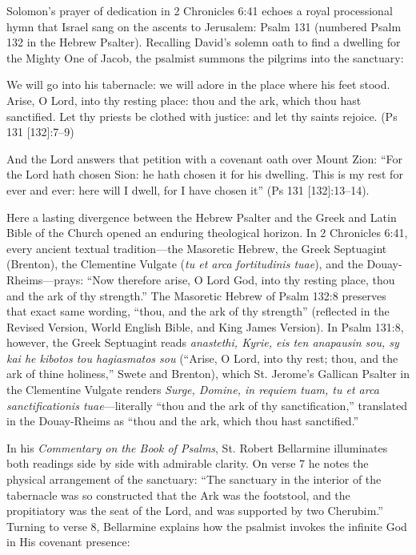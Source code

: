 Solomon's prayer of dedication in 2 Chronicles 6:41 echoes a royal processional hymn that Israel sang on the ascents to Jerusalem: Psalm 131 (numbered Psalm 132 in the Hebrew Psalter). Recalling David's solemn oath to find a dwelling for the Mighty One of Jacob, the psalmist summons the pilgrims into the sanctuary:

\begin{scriptureblock}
We will go into his tabernacle: we will adore in the place where his feet stood. Arise, O Lord, into thy resting place: thou and the ark, which thou hast sanctified. Let thy priests be clothed with justice: and let thy saints rejoice. \textnormal{(Ps 131 [132]:7--9)}
\end{scriptureblock}

And the Lord answers that petition with a covenant oath over Mount Zion: ``For the Lord hath chosen Sion: he hath chosen it for his dwelling. This is my rest for ever and ever: here will I dwell, for I have chosen it'' (Ps 131 [132]:13--14).

Here a lasting divergence between the Hebrew Psalter and the Greek and Latin Bible of the Church opened an enduring theological horizon. In 2 Chronicles 6:41, every ancient textual tradition---the Masoretic Hebrew, the Greek Septuagint (Brenton), the Clementine Vulgate (\textit{tu et arca fortitudinis tuae}), and the Douay-Rheims---prays: ``Now therefore arise, O Lord God, into thy resting place, thou and the ark of thy strength.'' The Masoretic Hebrew of Psalm 132:8 preserves that exact same wording, ``thou, and the ark of thy strength'' (reflected in the Revised Version, World English Bible, and King James Version). In Psalm 131:8, however, the Greek Septuagint reads \textit{anastethi, Kyrie, eis ten anapausin sou, sy kai he kibotos tou hagiasmatos sou} (``Arise, O Lord, into thy rest; thou, and the ark of thine holiness,'' Swete and Brenton), which St. Jerome's Gallican Psalter in the Clementine Vulgate renders \textit{Surge, Domine, in requiem tuam, tu et arca sanctificationis tuae}---literally ``thou and the ark of thy sanctification,'' translated in the Douay-Rheims as ``thou and the ark, which thou hast sanctified.''

In his \textit{Commentary on the Book of Psalms}, St. Robert Bellarmine illuminates both readings side by side with admirable clarity. On verse 7 he notes the physical arrangement of the sanctuary: ``The sanctuary in the interior of the tabernacle was so constructed that the Ark was the footstool, and the propitiatory was the seat of the Lord, and was supported by two Cherubim.'' Turning to verse 8, Bellarmine explains how the psalmist invokes the infinite God in His covenant presence:

